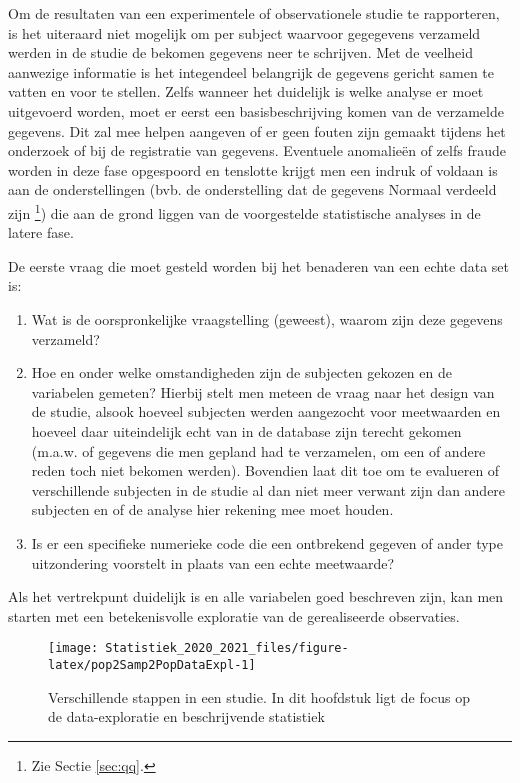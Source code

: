 \documentclass[
  12pt,dutch,coursenotes]{book}
\providecommand{\tightlist}{%
  \setlength{\itemsep}{0pt}\setlength{\parskip}{0pt}}
\theoremstyle{definition}
\theoremstyle{definition}
\theoremstyle{definition}
\theoremstyle{remark}
\begin{document}
Om de resultaten van een experimentele of observationele studie te
rapporteren, is het uiteraard niet mogelijk om per subject waarvoor gegegevens verzameld werden in de studie de bekomen gegevens neer te schrijven. Met
de veelheid aanwezige informatie is het integendeel belangrijk de gegevens
gericht samen te vatten en voor te stellen. Zelfs wanneer het duidelijk is welke analyse er moet uitgevoerd worden, moet er eerst een
basisbeschrijving komen van de verzamelde gegevens. Dit zal mee helpen
aangeven of er geen fouten zijn gemaakt tijdens het onderzoek of bij de
registratie van gegevens. Eventuele anomalieën of zelfs fraude worden in
deze fase opgespoord en tenslotte krijgt men een indruk of voldaan is aan de
onderstellingen (bvb. de onderstelling dat de gegevens Normaal verdeeld zijn
\footnote{Zie Sectie \ref{sec:qq}.}) die aan de grond liggen van de voorgestelde
statistische analyses in de latere fase.

De eerste vraag die moet gesteld worden bij het benaderen van een echte data
set is:

\begin{enumerate}
\def\labelenumi{\arabic{enumi}.}
\tightlist
\item
  Wat is de oorspronkelijke vraagstelling (geweest), waarom zijn deze
  gegevens verzameld?
\item
  Hoe en onder welke omstandigheden zijn de subjecten gekozen en de variabelen gemeten? Hierbij stelt men meteen de vraag naar het design van de studie, alsook hoeveel subjecten werden aangezocht voor meetwaarden en hoeveel daar uiteindelijk echt van in de database zijn terecht gekomen (m.a.w. of gegevens die men gepland had te verzamelen, om een of andere reden toch niet bekomen werden). Bovendien laat dit toe om te evalueren of verschillende subjecten in de studie al dan niet meer verwant zijn dan andere subjecten en of de analyse hier rekening mee moet houden.
\item
  Is er een specifieke numerieke code die een ontbrekend gegeven of
  ander type uitzondering voorstelt in plaats van een echte meetwaarde?
\end{enumerate}

Als het vertrekpunt duidelijk is en alle variabelen goed beschreven zijn,
kan men starten met een betekenisvolle exploratie van de gerealiseerde
observaties.

\begin{figure}

{\centering \texttt{[image: Statistiek\_2020\_2021\_files/figure-latex/pop2Samp2PopDataExpl-1]} 

}

\caption{Verschillende stappen in een studie. In dit hoofdstuk ligt de focus op de data-exploratie en beschrijvende statistiek}\label{fig:pop2Samp2PopDataExpl}
\end{figure}
\end{document}
